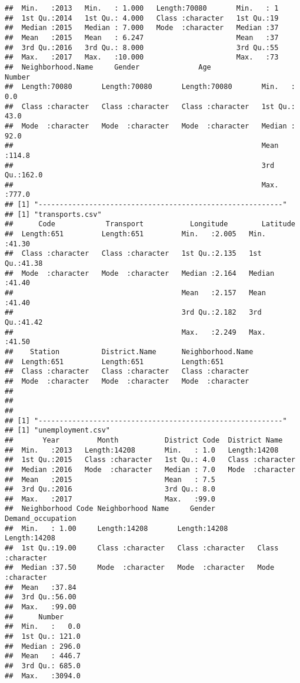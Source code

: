 \documentclass[
]{article}
\begin{document}
\begin{verbatim}
##  Min.   :2013   Min.   : 1.000   Length:70080       Min.   : 1       
##  1st Qu.:2014   1st Qu.: 4.000   Class :character   1st Qu.:19       
##  Median :2015   Median : 7.000   Mode  :character   Median :37       
##  Mean   :2015   Mean   : 6.247                      Mean   :37       
##  3rd Qu.:2016   3rd Qu.: 8.000                      3rd Qu.:55       
##  Max.   :2017   Max.   :10.000                      Max.   :73       
##  Neighborhood.Name     Gender              Age                Number     
##  Length:70080       Length:70080       Length:70080       Min.   :  0.0  
##  Class :character   Class :character   Class :character   1st Qu.: 43.0  
##  Mode  :character   Mode  :character   Mode  :character   Median : 92.0  
##                                                           Mean   :114.8  
##                                                           3rd Qu.:162.0  
##                                                           Max.   :777.0  
## [1] "----------------------------------------------------------"
## [1] "transports.csv"
##      Code            Transport           Longitude        Latitude    
##  Length:651         Length:651         Min.   :2.005   Min.   :41.30  
##  Class :character   Class :character   1st Qu.:2.135   1st Qu.:41.38  
##  Mode  :character   Mode  :character   Median :2.164   Median :41.40  
##                                        Mean   :2.157   Mean   :41.40  
##                                        3rd Qu.:2.182   3rd Qu.:41.42  
##                                        Max.   :2.249   Max.   :41.50  
##    Station          District.Name      Neighborhood.Name 
##  Length:651         Length:651         Length:651        
##  Class :character   Class :character   Class :character  
##  Mode  :character   Mode  :character   Mode  :character  
##                                                          
##                                                          
##                                                          
## [1] "----------------------------------------------------------"
## [1] "unemployment.csv"
##       Year         Month           District Code  District Name     
##  Min.   :2013   Length:14208       Min.   : 1.0   Length:14208      
##  1st Qu.:2015   Class :character   1st Qu.: 4.0   Class :character  
##  Median :2016   Mode  :character   Median : 7.0   Mode  :character  
##  Mean   :2015                      Mean   : 7.5                     
##  3rd Qu.:2016                      3rd Qu.: 8.0                     
##  Max.   :2017                      Max.   :99.0                     
##  Neighborhood Code Neighborhood Name     Gender          Demand_occupation 
##  Min.   : 1.00     Length:14208       Length:14208       Length:14208      
##  1st Qu.:19.00     Class :character   Class :character   Class :character  
##  Median :37.50     Mode  :character   Mode  :character   Mode  :character  
##  Mean   :37.84                                                             
##  3rd Qu.:56.00                                                             
##  Max.   :99.00                                                             
##      Number      
##  Min.   :   0.0  
##  1st Qu.: 121.0  
##  Median : 296.0  
##  Mean   : 446.7  
##  3rd Qu.: 685.0  
##  Max.   :3094.0
\end{verbatim}
\end{document}
